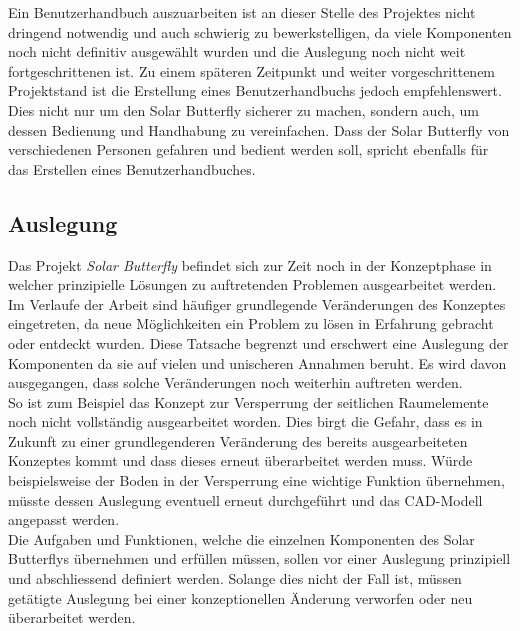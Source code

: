 Ein Benutzerhandbuch auszuarbeiten ist an dieser Stelle des Projektes nicht dringend notwendig und auch schwierig zu bewerkstelligen, da viele Komponenten noch nicht definitiv ausgewählt wurden und die Auslegung noch nicht weit fortgeschrittenen ist. Zu einem späteren Zeitpunkt und weiter vorgeschrittenem Projektstand ist die Erstellung eines Benutzerhandbuchs jedoch empfehlenswert. Dies nicht nur um den Solar Butterfly sicherer zu machen, sondern auch, um dessen Bedienung und Handhabung zu vereinfachen. Dass der Solar Butterfly von verschiedenen Personen gefahren und bedient werden soll, spricht ebenfalls für das Erstellen eines Benutzerhandbuches.


\subsection{Auslegung}
Das Projekt \emph{Solar Butterfly} befindet sich zur Zeit noch in der Konzeptphase in welcher prinzipielle Lösungen zu auftretenden Problemen ausgearbeitet werden. Im Verlaufe der Arbeit sind häufiger grundlegende Veränderungen des Konzeptes eingetreten, da neue Möglichkeiten ein Problem zu lösen in Erfahrung gebracht oder entdeckt wurden. Diese Tatsache begrenzt und erschwert eine Auslegung der Komponenten da sie auf vielen und unischeren Annahmen beruht. Es wird davon ausgegangen, dass solche Veränderungen noch weiterhin auftreten werden.\\
So ist zum Beispiel das Konzept zur Versperrung der seitlichen Raumelemente noch nicht vollständig ausgearbeitet worden. Dies birgt die Gefahr, dass es in Zukunft zu einer grundlegenderen Veränderung des bereits ausgearbeiteten Konzeptes kommt und dass dieses erneut überarbeitet werden muss. Würde beispielsweise der Boden in der Versperrung eine wichtige Funktion übernehmen, müsste dessen Auslegung eventuell erneut durchgeführt und das CAD-Modell angepasst werden.\\
Die Aufgaben und Funktionen, welche die einzelnen Komponenten des Solar Butterflys übernehmen und erfüllen müssen, sollen vor einer Auslegung prinzipiell und abschliessend definiert werden. Solange dies nicht der Fall ist, müssen getätigte Auslegung bei einer konzeptionellen Änderung verworfen oder neu überarbeitet werden.

